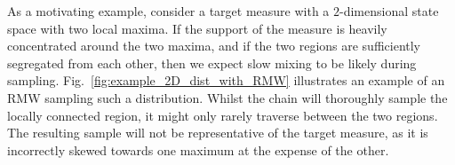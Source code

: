 
As a motivating example, consider a target measure with a $2$-dimensional state space with two local maxima. If the support of the measure is heavily concentrated around the two maxima, and if the two regions are sufficiently segregated from each other, then we expect slow mixing to be likely during sampling. Fig.~\ref{fig:example_2D_dist_with_RMW} illustrates an example of an RMW sampling such a distribution. Whilst the chain will thoroughly sample the locally connected region, it might only rarely traverse between the two regions. The resulting sample will not be representative of the target measure, as it is incorrectly skewed towards one maximum at the expense of the other.

